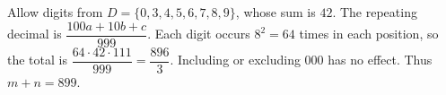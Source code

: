 Allow digits from $D=\{0,3,4,5,6,7,8,9\}$, whose sum is $42$. The repeating decimal is $\dfrac{100a+10b+c}{999}$. Each digit occurs $8^2=64$ times in each position, so the total is $\dfrac{64\cdot42\cdot111}{999}=\dfrac{896}{3}$. Including or excluding $000$ has no effect. Thus $m+n=\boxed{899}$.
